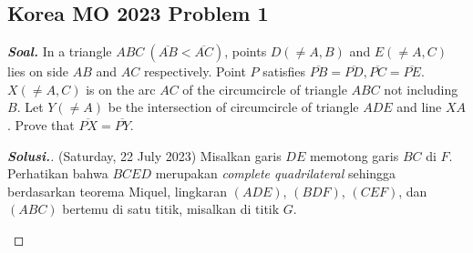 \documentclass[letterpaper, 13pt]{scrartcl}
\begin{document}
\subsection{Korea MO 2023 Problem 1}

\textbf{\textit{Soal. }}In a triangle $ABC ~(\overline{AB} < \overline{AC})$, points $D (\neq A, B)$ and $E (\neq A, C)$ lies on side $AB$ and $AC$ respectively. Point $P$ satisfies $\overline{PB}=\overline{PD}, \overline{PC}=\overline{PE}$. $X (\neq A, C)$ is on the arc $AC$ of the circumcircle of triangle $ABC$ not including $B$. Let $Y (\neq A)$ be the intersection of circumcircle of triangle $ADE$ and line $XA$. Prove that $\overline{PX} = \overline{PY}$.

\begin{proof}[\textbf{Solusi.}] (Saturday, 22 July 2023)
    Misalkan garis $DE$ memotong garis $BC$ di $F$. Perhatikan bahwa $BCED$ merupakan \textit{complete quadrilateral} sehingga berdasarkan teorema Miquel, lingkaran $(ADE)$, $(BDF)$, $(CEF)$, dan $(ABC)$ bertemu di satu titik, misalkan di titik $G$. 

\begin{center}
\end{center}
\end{proof}
\end{document}
